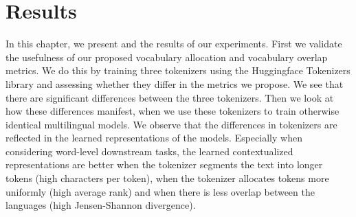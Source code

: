 \chapter{Results}



In this chapter, we present  and the results of our experiments. First we validate the usefulness of our proposed vocabulary allocation and vocabulary overlap metrics.  We do this by training three tokenizers using the Huggingface Tokenizers library and assessing whether they differ in the metrics we propose. We see that there are significant differences between the three tokenizers. Then we look at how these differences manifest, when we use these tokenizers to train otherwise identical multilingual models. We observe that the differences in tokenizers are reflected in the learned representations of the models. Especially when considering word-level downstream tasks, the learned contextualized representations are better when the tokenizer segments the text into longer tokens (high characters per token), when the tokenizer allocates tokens more uniformly (high average rank) and when there is less overlap between the languages (high Jensen-Shannon divergence).

